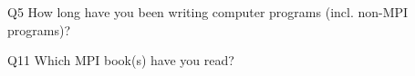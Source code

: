 \begin{description}%
\item{Q5} How long have you been writing computer programs (incl. non-MPI programs)?%
\item{Q11} Which MPI book(s) have you read?%
\end{description}%
